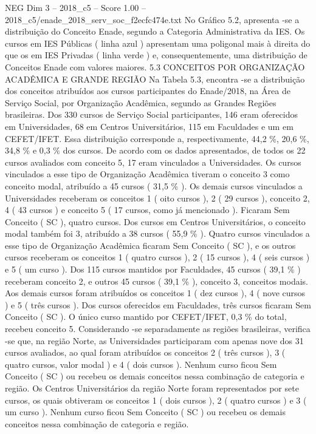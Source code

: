 \begin{textsample}{NEG Dim 3 – 2018\_c5 – Score 1.00 – 2018\_c5/enade\_2018\_serv\_soc\_f2ecfc474e.txt}
No Gráfico 5.2, apresenta -se a distribuição do Conceito Enade, segundo a Categoria Administrativa da IES.
Os cursos em IES Públicas ( linha azul ) apresentam uma poligonal mais à direita do que os em IES Privadas ( linha verde ) e, consequentemente, uma distribuição de Conceitos Enade com valores maiores. 5.3 CONCEITOS POR ORGANIZAÇÃO ACADÊMICA E GRANDE REGIÃO Na Tabela 5.3, encontra -se a distribuição dos conceitos atribuídos aos cursos participantes do Enade/2018, na Área de Serviço Social, por Organização Acadêmica, segundo as Grandes Regiões brasileiras.
Dos 330 cursos de Serviço Social participantes, 146 eram oferecidos em Universidades, 68 em Centros Universitários, 115 em Faculdades e um em CEFET/IFET.
Essa distribuição corresponde a, respectivamente, 44,2 \%, 20,6 \%, 34,8 \% e 0,3 \% dos cursos.
De acordo com os dados apresentados, de todos os 22 cursos avaliados com conceito 5, 17 eram vinculados a Universidades.
Os cursos vinculados a esse tipo de Organização Acadêmica tiveram o conceito 3 como conceito modal, atribuído a 45 cursos ( 31,5 \% ).
Os demais cursos vinculados a Universidades receberam os conceitos 1 ( oito cursos ), 2 ( 29 cursos ), conceito 2, 4 ( 43 cursos ) e conceito 5 ( 17 cursos, como já mencionado ).
Ficaram Sem Conceito ( SC ), quatro cursos.
Dos cursos em Centros Universitários, o conceito modal também foi 3, atribuído a 38 cursos ( 55,9 \% ).
Quatro cursos vinculados a esse tipo de Organização Acadêmica ficaram Sem Conceito ( SC ), e os outros cursos receberam os conceitos 1 ( quatro cursos ), 2 ( 15 cursos ), 4 ( seis cursos ) e 5 ( um curso ).
Dos 115 cursos mantidos por Faculdades, 45 cursos ( 39,1 \% ) receberam conceito 2, e outros 45 cursos ( 39,1 \% ), conceito 3, conceitos modais.
Aos demais cursos foram atribuídos os conceitos 1 ( dez cursos ), 4 ( nove cursos ) e 5 ( três cursos ).
Dos cursos oferecidos em Faculdades, três cursos ficaram Sem Conceito ( SC ).
O único curso mantido por CEFET/IFET, 0,3 \% do total, recebeu conceito 5.
Considerando -se separadamente as regiões brasileiras, verifica -se que, na região Norte, as Universidades participaram com apenas nove dos 31 cursos avaliados, ao qual foram atribuídos os conceitos 2 ( três cursos ), 3 ( quatro cursos, valor modal ) e 4 ( dois cursos ).
Nenhum curso ficou Sem Conceito ( SC ) ou recebeu os demais conceitos nessa combinação de categoria e região.
Os Centros Universitários da região Norte foram representados por sete cursos, os quais obtiveram os conceitos 1 ( dois cursos ), 2 ( quatro cursos ) e 3 ( um curso ).
Nenhum curso ficou Sem Conceito ( SC ) ou recebeu os demais conceitos nessa combinação de categoria e região.

\end{textsample}
